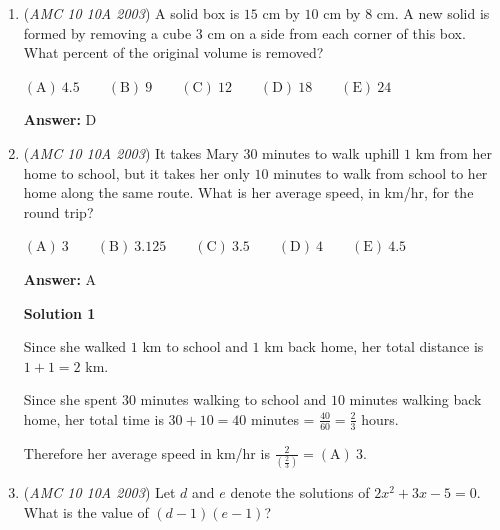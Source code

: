 \begin{enumerate}
Since T-shirts cost $5$ dollars more than a pair of socks, T-shirts cost $5+4=9$ dollars. 

 Since each member needs $2$ pairs of socks and $2$ T-shirts, the total cost for $1$ member is $2(4+9)=26$ dollars. 

 Since $2366$ dollars was the cost for the club, and $26$ was the cost per member, the number of members in the League is $2366\div 26=\boxed{\mathrm{(B)}\ 91}$. 

 \href{https://drive.google.com/file/d/1tU\_HmCUMWZ-DMsGcz\_7wLy8tniXDh0q0/view?usp=drivesdk}{https://drive.google.com/file/d/1tU\_HmCUMWZ-DMsGcz\_7wLy8tniXDh0q0/view?usp=drivesdk}

 


	\item (\textit{AMC 10 10A 2003}) A solid box is $15$ cm by $10$ cm by $8$ cm. A new solid is formed by removing a cube $3$ cm on a side from each corner of this box. What percent of the original volume is removed? 


 $\mathrm{(A) \ } 4.5\qquad \mathrm{(B) \ } 9\qquad \mathrm{(C) \ } 12\qquad \mathrm{(D) \ } 18\qquad \mathrm{(E) \ } 24$

 \textbf{Answer: }D


	\item (\textit{AMC 10 10A 2003}) It takes Mary $30$ minutes to walk uphill $1$ km from her home to school, but it takes her only $10$ minutes to walk from school to her home along the same route. What is her average speed, in km/hr, for the round trip? 


 $\mathrm{(A) \ } 3\qquad \mathrm{(B) \ } 3.125\qquad \mathrm{(C) \ } 3.5\qquad \mathrm{(D) \ } 4\qquad \mathrm{(E) \ } 4.5$

 \textbf{Answer: }A



\textbf{Solution 1}

Since she walked $1$ km to school and $1$ km back home, her total distance is $1+1=2$ km. 

 Since she spent $30$ minutes walking to school and $10$ minutes walking back home, her total time is $30+10=40$ minutes = $\frac{40}{60}=\frac{2}{3}$ hours. 

 Therefore her average speed in km/hr is $\frac{2}{\left(\frac{2}{3}\right)}=\boxed{\mathrm{(A)}\ 3}$.

 


	\item (\textit{AMC 10 10A 2003}) Let $d$ and $e$ denote the solutions of $2x^{2}+3x-5=0$. What is the value of $(d-1)(e-1)$? 



\end{enumerate}
